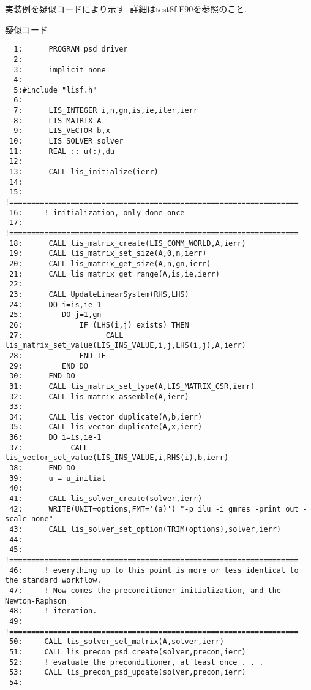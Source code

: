 \documentclass[a4paper]{jarticle}
\begin{document}
{{\vspace{1pc}

実装例を疑似コードにより示す. 詳細はtest8f.F90を参照のこと. 

\vspace{1pc}

\begin{itemsquarebox}[l]{疑似コード}
{\small
\begin{verbatim}
  1:      PROGRAM psd_driver
  2:
  3:      implicit none
  4:      
  5:#include "lisf.h"
  6:
  7:      LIS_INTEGER i,n,gn,is,ie,iter,ierr
  8:      LIS_MATRIX A
  9:      LIS_VECTOR b,x
 10:      LIS_SOLVER solver
 11:      REAL :: u(:),du
 12:
 13:      CALL lis_initialize(ierr)
 14:
 15:     !==================================================================
 16:     ! initialization, only done once
 17:     !==================================================================
 18:      CALL lis_matrix_create(LIS_COMM_WORLD,A,ierr)
 19:      CALL lis_matrix_set_size(A,0,n,ierr)
 20:      CALL lis_matrix_get_size(A,n,gn,ierr)
 21:      CALL lis_matrix_get_range(A,is,ie,ierr)
 22:
 23:      CALL UpdateLinearSystem(RHS,LHS)
 24:      DO i=is,ie-1
 25:         DO j=1,gn
 26:             IF (LHS(i,j) exists) THEN
 27:                   CALL lis_matrix_set_value(LIS_INS_VALUE,i,j,LHS(i,j),A,ierr)
 28:             END IF
 29:         END DO
 30:      END DO
 31:      CALL lis_matrix_set_type(A,LIS_MATRIX_CSR,ierr)
 32:      CALL lis_matrix_assemble(A,ierr)
 33:
 34:      CALL lis_vector_duplicate(A,b,ierr)
 35:      CALL lis_vector_duplicate(A,x,ierr)
 36:      DO i=is,ie-1
 37:           CALL lis_vector_set_value(LIS_INS_VALUE,i,RHS(i),b,ierr)
 38:      END DO
 39:      u = u_initial
 40:
 41:      CALL lis_solver_create(solver,ierr)
 42:      WRITE(UNIT=options,FMT='(a)') "-p ilu -i gmres -print out -scale none"
 43:      CALL lis_solver_set_option(TRIM(options),solver,ierr)
 44:
 45:     !==================================================================
 46:     ! everything up to this point is more or less identical to the standard workflow.
 47:     ! Now comes the preconditioner initialization, and the Newton-Raphson
 48:     ! iteration.
 49:     !==================================================================
 50:     CALL lis_solver_set_matrix(A,solver,ierr)
 51:     CALL lis_precon_psd_create(solver,precon,ierr)
 52:     ! evaluate the preconditioner, at least once . . .
 53:     CALL lis_precon_psd_update(solver,precon,ierr)
 54:
\end{verbatim}
}
\end{itemsquarebox}

}}
\end{document}
